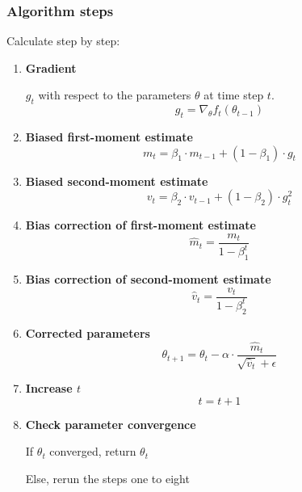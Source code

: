 \documentclass[oneside]{article}
\begin{document}
\subsubsection{Algorithm steps}
Calculate step by step:
\begin{enumerate}
    \item \textbf{Gradient} \par
    \(g_t\) with respect to the parameters \(\theta\) at time step \(t\).
    \begin{equation}
        g_t= \nabla_{\theta} f_t(\theta_{t-1})
    \end{equation}
    \item \textbf{Biased first-moment estimate}
    \begin{equation}
        m_t = \beta_1 \cdot m_{t-1} + (1 - \beta_1) \cdot g_t
    \end{equation}
    
    \item \textbf{Biased second-moment estimate}
    \begin{equation}
        v_t = \beta_2 \cdot v_{t-1} + (1 - \beta_2) \cdot g_t^2
    \end{equation}
    
    \item \textbf{Bias correction of first-moment estimate}
    \begin{equation}
        \hat{m}_t = \frac{m_t}{1 - \beta_1^t}
    \end{equation}
    
    \item \textbf{Bias correction of second-moment estimate}
    \begin{equation}
        \hat{v}_t = \frac{v_t}{1 - \beta_2^t}
    \end{equation}
    
    \item  \textbf{Corrected parameters}
    \begin{equation}
        \theta_{t+1} = \theta_t - \alpha \cdot \frac{\hat{m}_t}{\sqrt{\hat{v}_t} + \epsilon}
    \end{equation}
    
    \item \textbf{Increase $t$} 
    \begin{equation}
        t = t + 1
    \end{equation}
    \item \textbf{Check parameter convergence}\par
    If $\theta_t$ converged, return $\theta_t$\par
    Else, rerun the steps one to eight
\end{enumerate}
\end{document}
